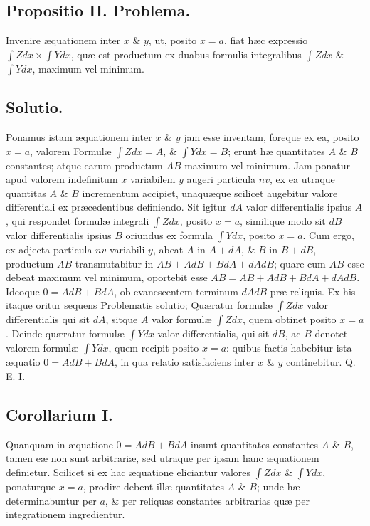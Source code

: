 \subsection*{Propositio II. Problema.}
Invenire æquationem inter $x$ \& $y$, ut, posito $x=a$, fiat hæc expressio $\int Zdx\times\int Ydx$, quæ est productum ex duabus formulis integralibus $\int Zdx$ \& $\int Ydx$, maximum vel minimum.
\subsection*{Solutio.}
Ponamus istam æquationem inter $x$ \& $y$ jam esse inventam, foreque ex ea, posito $x=a$, valorem Formulæ $\int Zdx=A$, \& $\int Ydx=B$; erunt hæ quantitates $A$ \& $B$ constantes; atque earum productum $AB$ maximum vel minimum. Jam ponatur apud valorem indefinitum $x$ variabilem $y$ augeri particula $nv$, ex ea utraque quantitas $A$ \& $B$ incrementum accipiet, unaquæque scilicet augebitur valore differentiali ex præcedentibus definiendo. Sit igitur $dA$ valor differentialis ipsius $A$, qui respondet formulæ integrali $\int Zdx$, posito $x=a$, similique modo sit $dB$ valor differentialis ipsius $B$ oriundus ex formula $\int Ydx$, posito $x=a$. Cum ergo, ex adjecta particula $nv$ variabili $y$, abeat $A$ in $A+dA$, \& $B$ in $B+dB$, productum $AB$ transmutabitur in $AB+AdB+BdA+dAdB$; quare cum $AB$ esse debeat maximum vel minimum, oportebit esse $AB=AB+AdB+BdA+dAdB$. Ideoque $0=AdB+BdA$, ob evanescentem terminum $dAdB$ præ reliquis. Ex his itaque oritur sequens Problematis solutio; Quæratur formulæ $\int Zdx$ valor differentialis qui sit $dA$, sitque $A$ valor formulæ $\int Zdx$, quem obtinet posito $x=a$. Deinde quæratur formulæ $\int Ydx$ valor differentialis, qui sit $dB$, ac $B$ denotet valorem formulæ $\int Ydx$, quem recipit posito $x=a$: quibus factis habebitur ista æquatio $0=AdB+BdA$, in qua relatio satisfaciens inter $x$ \& $y$ continebitur. Q. E. I.
\subsection*{Corollarium I.}
Quanquam in æquatione $0=AdB+BdA$ insunt quantitates constantes $A$ \& $B$, tamen eæ non sunt arbitrariæ, sed utraque per ipsam hanc æquationem definietur. Scilicet si ex hac æquatione eliciantur valores $\int Zdx$ \& $\int Ydx$, ponaturque $x=a$, prodire debent illæ quantitates $A$ \& $B$; unde hæ determinabuntur per $a$, \& per reliquas constantes arbitrarias quæ per integrationem ingredientur.
